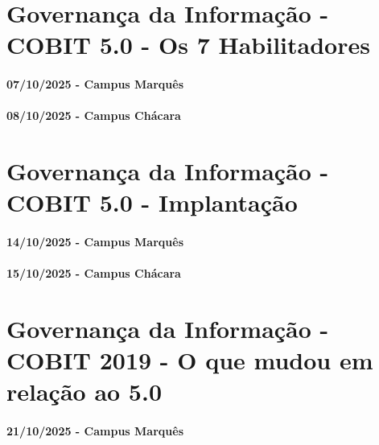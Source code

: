 \documentclass[
]{book}
\begin{document}
\chapter{Governança da Informação - COBIT 5.0 - Os 7 Habilitadores}\label{governanuxe7a-da-informauxe7uxe3o---cobit-5.0---os-7-habilitadores}

\subsubsection*{07/10/2025 - Campus Marquês}\label{campus-marquuxeas-8}

\subsubsection*{08/10/2025 - Campus Chácara}\label{campus-chuxe1cara-8}

\chapter{Governança da Informação - COBIT 5.0 - Implantação}\label{governanuxe7a-da-informauxe7uxe3o---cobit-5.0---implantauxe7uxe3o}

\subsubsection*{14/10/2025 - Campus Marquês}\label{campus-marquuxeas-9}

\subsubsection*{15/10/2025 - Campus Chácara}\label{campus-chuxe1cara-9}

\chapter{Governança da Informação - COBIT 2019 - O que mudou em relação ao 5.0}\label{governanuxe7a-da-informauxe7uxe3o---cobit-2019---o-que-mudou-em-relauxe7uxe3o-ao-5.0}

\subsubsection*{21/10/2025 - Campus Marquês}\label{campus-marquuxeas-10}
\end{document}
